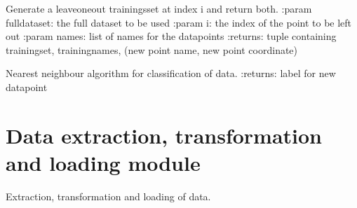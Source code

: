 \documentclass[letterpaper,10pt,english]{sphinxmanual}
\begin{document}
\begin{fulllineitems}
\label{\detokenize{classification:classification.generateTrainingset}}
\sphinxAtStartPar
Generate a leave\sphinxhyphen{}one\sphinxhyphen{}out trainingsset at index i and return both.
:param fulldataset: the full dataset to be used 
:param i: the index of the point to be left out 
:param names: list of names for the datapoints
:returns: tuple containing trainingset, trainingnames, (new point name, new point coordinate)

\end{fulllineitems}


\begin{fulllineitems}
\label{\detokenize{classification:classification.nearestNeighbour}}
\sphinxAtStartPar
Nearest neighbour algorithm for classification of data.
:returns: label for new datapoint

\end{fulllineitems}



\section{Data extraction, transformation and loading module}
\label{\detokenize{dataETL:module-dataETL}}\label{\detokenize{dataETL:data-extraction-transformation-and-loading-module}}\label{\detokenize{dataETL::doc}}
\sphinxAtStartPar
Extraction, transformation and loading of data.
\end{document}
